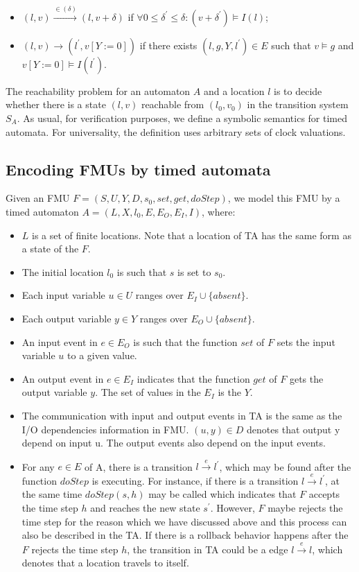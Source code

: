 \begin{itemize}
\item
$(l,v) \xrightarrow{\in(\delta)} (l,v+\delta)$ if $\forall0 \leqslant \delta^{\prime} \leqslant \delta : (v + \delta^{\prime}) \models I(l)$;
\item
$(l,v) \rightarrow(l^{\prime},v[Y := 0])$ if there exists $(l,g,Y,l^{\prime}) \in E$ such that $v \models g$ and $v[Y := 0 ] \models I(l^{\prime})$.
\end{itemize}
The reachability problem for an automaton $A$ and a location $l$ is to decide whether there is a state $(l,v)$ reachable from $(l_{0},v_{0})$ in the transition system $S_{A}$. As usual, for verification purposes, we define a symbolic semantics for timed automata. For universality, the definition uses arbitrary sets of clock valuations.
\subsection{Encoding FMUs by timed automata}
Given an FMU $F=(S,U,Y,D,s_{0},set,get,doStep)$, we model this FMU by a timed automaton $A = (L,X,l_{0},E,E_{O},E_{I},I)$, where:
\begin{itemize}
\item
$L$ is a set of finite locations. Note that a location of TA has the same form as a state of the $F$.
\item
The initial location $l_{0}$ is such that $s$ is set to $s_{0}$. 
\item
Each input variable $u \in U$ ranges over $E_{I} \cup \{absent\}$.
\item
Each output variable $y \in Y$ ranges over $E_{O} \cup \{absent\}$.
\item
An input event in $e \in E_{O}$ is such that the function $set$ of $F$ sets the input variable $u$ to a given value. 
\item
An output event in $e \in E_{I}$ indicates that the function $get$ of $F$ gets the output variable $y$. The set of values in the $E_{I}$ is the $Y$.  
\item
The communication with input and output events in TA is the same as the I/O dependencies information in FMU. $(u,y) \in D$ denotes that output y depend on input u. The output events also depend on the input events.
\item
For any $e \in E$ of A, there is a transition $l \xrightarrow{e} l^{\prime}$, which may be found after the function $doStep$ is executing. For instance, if there is a transition $l \xrightarrow{e} l^{\prime}$, at the same time $doStep(s,h)$ may be called which indicates that $F$ accepts the time step $h$ and reaches the new state $s^{\prime}$. However, $F$ maybe rejects the time step for the reason which we have discussed above and this process can also be described in the TA. If there is a rollback behavior happens after the $F$ rejects the time step $h$, the transition in TA could be a edge $l \xrightarrow{e} l$, which denotes that a location travels to itself.
\end{itemize}

